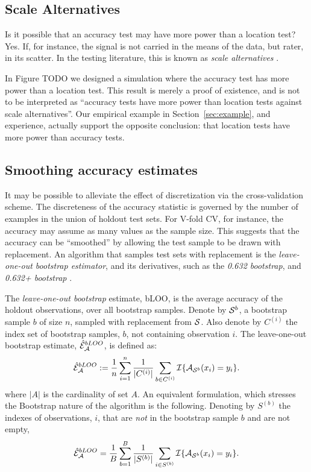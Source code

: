 \documentclass[12pt,a4paper]{article}
\begin{document}
\subsection{Scale Alternatives}
Is it possible that an accuracy test may have more power than a location test?
Yes. 
If, for instance, the signal is not carried in the means of the data, but rater, in its scatter. 
In the testing literature, this is known as \emph{scale alternatives} \cite[e.g.][and references therein]{ley2015high}.

In Figure TODO we designed a simulation where the accuracy test has more power than a location test. 
This result is merely a proof of existence, and is not to be interpreted as ``accuracy tests have more power than location tests against scale alternatives''.
Our empirical example in Section~\ref{sec:example}, and experience, actually support the opposite conclusion: that location tests have more power than accuracy tests. 





\subsection{Smoothing accuracy estimates}
\label{sec:bootstrap}
It may be possible to alleviate the effect of discretization via the cross-validation scheme.
The discreteness of the accuracy statistic is governed by the number of examples in the union of holdout test sets.
For V-fold CV, for instance, the accuracy may assume as many values as the sample size. 
This suggests that the accuracy can be ``smoothed'' by allowing the test sample to be drawn with replacement. 
An algorithm that samples test sets with replacement is the \emph{leave-one-out bootstrap estimator},  and its derivatives, such as the \emph{0.632 bootstrap}, and \emph{0.632+ bootstrap} \citep[Sec 7.11]{hastie_elements_2003}.
\begin{definition}[bLOO]
	\label{def:bloo}
	The \emph{leave-one-out bootstrap} estimate, bLOO, is the average accuracy of the holdout observations, over all bootstrap samples. 
	Denote by $\mathcal{S}^b$, a bootstrap sample $b$ of size $n$, sampled with replacement from $\mathcal{S}$. 
	Also denote by $C^{(i)}$ the index set of bootstrap samples, $b$, not containing observation $i$.
	The leave-one-out bootstrap estimate, $\hat{\mathcal{E}}_{\mathcal{A}}^{bLOO}$,  is defined as:
	\begin{align}
	\hat{\mathcal{E}}_{\mathcal{A}}^{bLOO}:= \frac 1n \sum_{i=1}^{n} \frac{1}{|C^{(i)}|} \sum_{b \in C^{(i)}} \mathcal{I}{\{ \mathcal{A}_{\mathcal{S}^b}(x_i)=y_i \}}.
	\end{align}
	where $|A|$ is the cardinality of set $A$.
	An equivalent formulation, which stresses the Bootstrap nature of the algorithm is the following. 
	Denoting by $S^{(b)}$ the indexes of observations, $i$, that are \emph{not} in the bootstrap sample $b$ and are not empty, 
	\begin{align}
	\hat{\mathcal{E}}_{\mathcal{A}}^{bLOO} = \frac 1B \sum_{b=1}^{B} \frac{1}{|S^{(b)}|} \sum_{i \in S^{(b)}} \mathcal{I}{\{ \mathcal{A}_{\mathcal{S}^b}(x_i)=y_i \}}.
	\end{align}
\end{definition}
\end{document}

